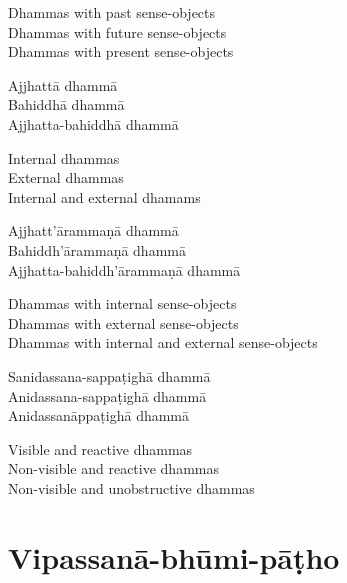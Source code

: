 \begin{english-verses}
  Dhammas with past sense-objects\\
  Dhammas with future sense-objects\\
  Dhammas with present sense-objects
\end{english-verses}

\begin{pali-hang-continued}
Ajjhattā dhammā\\
Bahiddhā dhammā\\
Ajjhatta-bahiddhā dhammā
\end{pali-hang-continued}

\begin{english-verses}
  Internal dhammas\\
  External dhammas\\
  Internal and external dhamams
\end{english-verses}

\begin{pali-hang-continued}
Ajjhatt'ārammaṇā dhammā\\
Bahiddh'ārammaṇā dhammā\\
Ajjhatta-bahiddh'ārammaṇā dhammā
\end{pali-hang-continued}

\begin{english-verses}
  Dhammas with internal sense-objects\\
  Dhammas with external sense-objects\\
  Dhammas with internal and external sense-objects
\end{english-verses}

\begin{pali-hang-continued}
Sanidassana-sappaṭighā dhammā\\
Anidassana-sappaṭighā dhammā\\
Anidassanāppaṭighā dhammā
\end{pali-hang-continued}

\begin{english-verses}
  Visible and reactive dhammas\\
  Non-visible and reactive dhammas\\
  Non-visible and unobstructive dhammas
\end{english-verses}

\suttaRef{[Dhs 1]}

\section{Vipassanā-bhūmi-pāṭho}
\label{vipassana-bhumi-patho}

